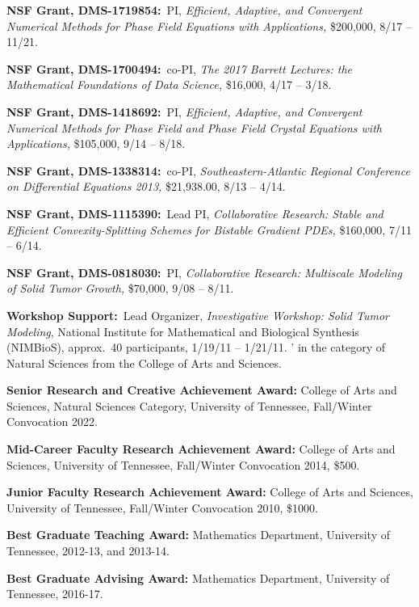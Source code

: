 \documentclass[11pt]{letter}
\begin{document}
\begin{description}
    \item
\textbf{NSF Grant, DMS-1719854:}~PI, {\sl Efficient, Adaptive, and Convergent Numerical Methods for Phase Field Equations with Applications,} \$200,000, 8/17 -- 11/21.


	 \item
\textbf{NSF Grant, DMS-1700494:}~co-PI, {\sl The 2017 Barrett Lectures: the Mathematical Foundations of Data Science,} \$16,000, 4/17 -- 3/18.

    \item
\textbf{NSF Grant, DMS-1418692:}~PI, {\sl Efficient, Adaptive, and Convergent Numerical Methods for Phase Field and Phase Field Crystal Equations with Applications,} \$105,000, 9/14 -- 8/18.

    \item
\textbf{NSF Grant, DMS-1338314:}~co-PI, {\sl Southeastern-Atlantic Regional Conference on Differential Equations 2013,} \$21,938.00, 8/13 -- 4/14.

    \item
\textbf{NSF Grant, DMS-1115390:}~Lead PI, {\sl Collaborative Research: Stable and Efficient Convexity-Splitting Schemes for Bistable Gradient PDEs,} \$160,000, 7/11 -- 6/14.

    \item
\textbf{NSF Grant, DMS-0818030:}~PI, {\sl Collaborative Research: Multiscale Modeling of Solid Tumor Growth,} \$70,000, 9/08 -- 8/11.
	
	\item
\textbf{Workshop Support:}~Lead Organizer, {\sl Investigative Workshop: Solid Tumor Modeling}, National Institute for Mathematical and Biological Synthesis (NIMBioS), approx.~40 participants, 1/19/11 -- 1/21/11.
	'
	 in the category of Natural Sciences from the College of Arts and Sciences.
	
	\item
\textbf{Senior Research and Creative Achievement Award:} College of Arts and Sciences, Natural Sciences Category, University of Tennessee, Fall/Winter Convocation 2022.
	
	\item
\textbf{Mid-Career Faculty Research Achievement Award:} College of Arts and Sciences, University of Tennessee, Fall/Winter Convocation 2014, \$500.
	\item
\textbf{Junior Faculty Research Achievement Award:} College of Arts and Sciences, University of Tennessee, Fall/Winter Convocation 2010, \$1000.
	\item
\textbf{Best Graduate Teaching Award:} Mathematics Department, University of Tennessee, 2012-13, and 2013-14.
	\item
\textbf{Best Graduate Advising Award:} Mathematics Department, University of Tennessee, 2016-17.

    \end{description}
	
\end{document}
